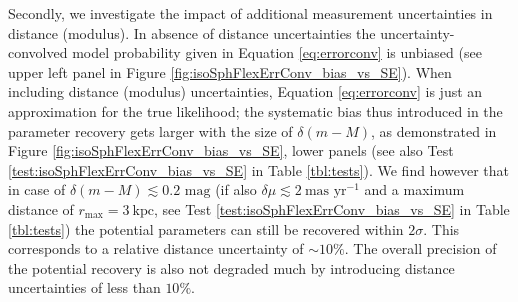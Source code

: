 \documentclass[iop,revtex4]{emulateapj}
\begin{document}
Secondly, we investigate the impact of additional measurement uncertainties in distance (modulus). In absence of distance uncertainties the uncertainty-convolved model probability given in Equation \eqref{eq:errorconv} is unbiased (see upper left panel in Figure \ref{fig:isoSphFlexErrConv_bias_vs_SE}).  When including distance (modulus) uncertainties, Equation \eqref{eq:errorconv} is just an approximation for the true likelihood; the systematic bias thus introduced in the parameter recovery gets larger with the size of $\delta (m-M)$, as demonstrated in Figure \ref{fig:isoSphFlexErrConv_bias_vs_SE}, lower panels (see also Test \ref{test:isoSphFlexErrConv_bias_vs_SE} in Table \ref{tbl:tests}).  We find however that in case of $\delta(m-M) \lesssim 0.2 \text{ mag}$ (if also $\delta \mu \lesssim 2 ~\text{mas yr}^{-1}$ and a maximum distance of $r_\text{max} = 3~\text{kpc}$, see Test \ref{test:isoSphFlexErrConv_bias_vs_SE} in Table \ref{tbl:tests}) the potential parameters can still be recovered within $2 \sigma$. This corresponds to a relative distance uncertainty of $\sim10\%$. The overall precision of the potential recovery is also not degraded much by introducing distance uncertainties of less than $10\%$.
\end{document}
